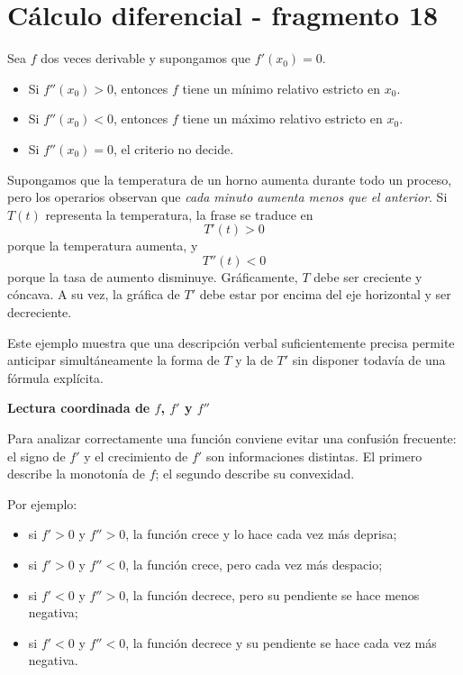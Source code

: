 \section{Cálculo diferencial - fragmento 18}
\begin{theorem}
Sea $f$ dos veces derivable y supongamos que $f'(x_0)=0$.
\begin{itemize}
\item Si $f''(x_0)>0$, entonces $f$ tiene un mínimo relativo estricto en $x_0$.
\item Si $f''(x_0)<0$, entonces $f$ tiene un máximo relativo estricto en $x_0$.
\item Si $f''(x_0)=0$, el criterio no decide.
\end{itemize}
\end{theorem}

\begin{example}
Supongamos que la temperatura de un horno aumenta durante todo un proceso, pero los operarios observan que \emph{cada minuto aumenta menos que el anterior}. Si $T(t)$ representa la temperatura, la frase se traduce en
\[
T'(t)>0
\]
porque la temperatura aumenta, y
\[
T''(t)<0
\]
porque la tasa de aumento disminuye. Gráficamente, $T$ debe ser creciente y cóncava. A su vez, la gráfica de $T'$ debe estar por encima del eje horizontal y ser decreciente.

Este ejemplo muestra que una descripción verbal suficientemente precisa permite anticipar simultáneamente la forma de $T$ y la de $T'$ sin disponer todavía de una fórmula explícita.
\end{example}

\textbf{Lectura coordinada de $f$, $f'$ y $f''$}

Para analizar correctamente una función conviene evitar una confusión frecuente: el signo de $f'$ y el crecimiento de $f'$ son informaciones distintas. El primero describe la monotonía de $f$; el segundo describe su convexidad.

Por ejemplo:
\begin{itemize}
\item si $f'>0$ y $f''>0$, la función crece y lo hace cada vez más deprisa;
\item si $f'>0$ y $f''<0$, la función crece, pero cada vez más despacio;
\item si $f'<0$ y $f''>0$, la función decrece, pero su pendiente se hace menos negativa;
\item si $f'<0$ y $f''<0$, la función decrece y su pendiente se hace cada vez más negativa.
\end{itemize}


